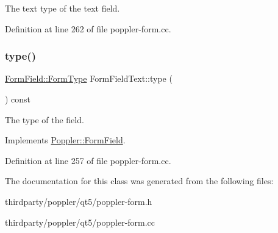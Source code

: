 The text type of the text field. 

Definition at line 262 of file poppler-\/form.\+cc.

\mbox{\label{class_poppler_1_1_form_field_text_a74337e7ec1ec0b4163a930212f808402}} 
\subsubsection{\texorpdfstring{type()}{type()}}
{\footnotesize\ttfamily \hyperlink{class_poppler_1_1_form_field_af9b28bf05b29780f81445b21a0ed7423}{Form\+Field\+::\+Form\+Type} Form\+Field\+Text\+::type (\begin{DoxyParamCaption}{ }\end{DoxyParamCaption}) const\hspace{0.3cm}{\ttfamily [virtual]}}

The type of the field. 

Implements \hyperlink{class_poppler_1_1_form_field_aec536e2f0468aedcc6b6d7df034442b2}{Poppler\+::\+Form\+Field}.



Definition at line 257 of file poppler-\/form.\+cc.



The documentation for this class was generated from the following files\+:\begin{DoxyCompactItemize}
\item 
thirdparty/poppler/qt5/poppler-\/form.\+h\item 
thirdparty/poppler/qt5/poppler-\/form.\+cc\end{DoxyCompactItemize}
